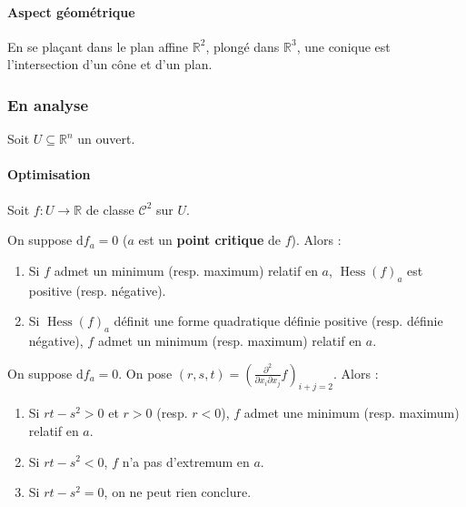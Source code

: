   \paragraph{Aspect géométrique}


  \begin{proposition}
    En se plaçant dans le plan affine $\mathbb{R}^2$, plongé dans $\mathbb{R}^3$, une conique est l'intersection d'un cône et d'un plan.
  \end{proposition}

  \subsubsection{En analyse}

  Soit $U \subseteq \mathbb{R}^n$ un ouvert.

  \paragraph{Optimisation}

  Soit $f : U \rightarrow \mathbb{R}$ de classe $\mathcal{C}^2$ sur $U$.


  \begin{theorem}
    On suppose $\mathrm{d}f_a = 0$ ($a$ est un \textbf{point critique} de $f$). Alors :
    \begin{enumerate}[label=(\roman*)]
      \item Si $f$ admet un minimum (resp. maximum) relatif en $a$, $\operatorname{Hess}(f)_a$ est positive (resp. négative).
      \item Si $\operatorname{Hess}(f)_a$ définit une forme quadratique définie positive (resp. définie négative), $f$ admet un minimum (resp. maximum) relatif en $a$.
    \end{enumerate}
  \end{theorem}

  \begin{example}
    On suppose $\mathrm{d}f_a = 0$. On pose $(r,s,t) = \left(  \frac{\partial^2}{\partial x_i \partial x_j} f \right)_{i+j=2}$. Alors :
    \begin{enumerate}[label=(\roman*)]
      \item Si $rt-s^2 > 0$ et $r > 0$ (resp. $r < 0$), $f$ admet une minimum (resp. maximum) relatif en $a$.
      \item Si $rt-s^2 < 0$, $f$ n'a pas d'extremum en $a$.
      \item Si $rt-s^2 = 0$, on ne peut rien conclure.
    \end{enumerate}
  \end{example}

